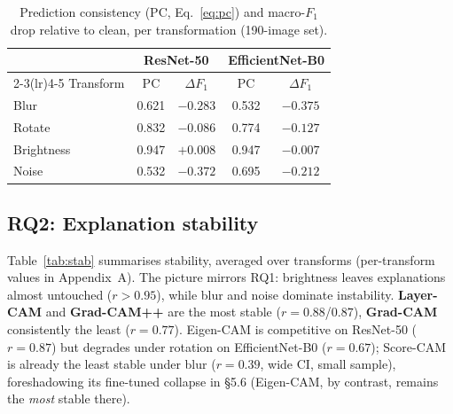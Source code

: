 \documentclass[runningheads]{llncs}
\begin{document}
\begin{table}[t]
\centering
\caption{Prediction consistency (PC, Eq.~\ref{eq:pc}) and macro-$F_1$ drop
relative to clean, per transformation (190-image set).}
\label{tab:pred}
\begin{tabular}{lcccc}
\toprule
 & \multicolumn{2}{c}{ResNet-50} & \multicolumn{2}{c}{EfficientNet-B0} \\
\cmidrule(lr){2-3}\cmidrule(lr){4-5}
Transform & PC & $\Delta F_1$ & PC & $\Delta F_1$ \\
\midrule
Blur       & 0.621 & $-0.283$ & 0.532 & $-0.375$ \\
Rotate     & 0.832 & $-0.086$ & 0.774 & $-0.127$ \\
Brightness & 0.947 & $+0.008$ & 0.947 & $-0.007$ \\
Noise      & 0.532 & $-0.372$ & 0.695 & $-0.212$ \\
\bottomrule
\end{tabular}
\end{table}


\subsection{RQ2: Explanation stability}
Table~\ref{tab:stab} summarises stability, averaged over transforms
(per-transform values in Appendix~A). The picture mirrors RQ1: brightness leaves
explanations almost untouched ($r>0.95$), while blur and noise dominate
instability. \textbf{Layer-CAM} and \textbf{Grad-CAM++} are the most stable
($r\!=\!0.88$/$0.87$), \textbf{Grad-CAM} consistently the least ($r\!=\!0.77$).
Eigen-CAM is competitive on ResNet-50 ($r\!=\!0.87$) but degrades under rotation on
EfficientNet-B0 ($r\!=\!0.67$); Score-CAM is already the least stable under blur
($r\!=\!0.39$, wide CI, small sample), foreshadowing its fine-tuned collapse in
\S5.6 (Eigen-CAM, by contrast, remains the \emph{most} stable there).
\end{document}
